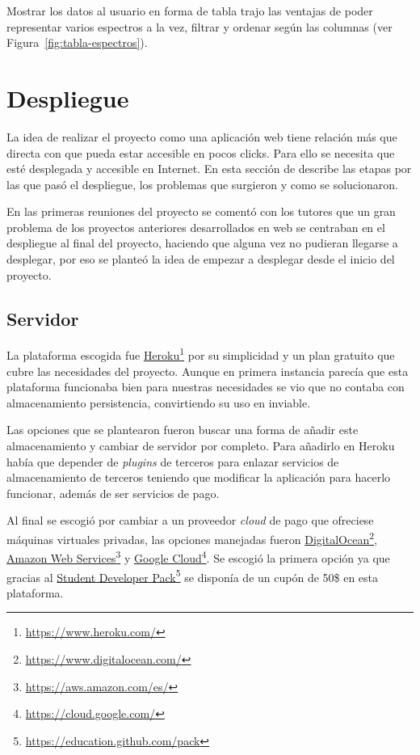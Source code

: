 Mostrar los datos al usuario en forma de tabla trajo las ventajas de poder
representar varios espectros a la vez, filtrar y ordenar según las columnas (ver
Figura~\ref{fig:tabla-espectros}).


\section{Despliegue}\label{sec:despliegue}

La idea de realizar el proyecto como una aplicación web tiene relación más que directa con que pueda estar accesible en pocos clicks. Para ello se necesita que esté desplegada y accesible en Internet. En esta sección de describe las etapas por las que pasó el despliegue, los problemas que surgieron y como se solucionaron.

En las primeras reuniones del proyecto se comentó con los tutores que un gran problema de los proyectos anteriores desarrollados en web se centraban en el despliegue al final del proyecto, haciendo que alguna vez no pudieran llegarse a desplegar, por eso se planteó la idea de empezar a desplegar desde el inicio del proyecto.

\subsection{Servidor}

La plataforma escogida fue \href{https://www.heroku.com/}{Heroku}\footnote{\url{https://www.heroku.com/}} por su simplicidad y un plan gratuito que cubre las necesidades del proyecto. Aunque en primera instancia parecía que esta plataforma funcionaba bien para nuestras necesidades se vio que no contaba con almacenamiento persistencia, convirtiendo su uso en inviable.

Las opciones que se plantearon fueron buscar una forma de añadir este almacenamiento y cambiar de servidor por completo. Para añadirlo en Heroku había que depender de \textit{plugins} de terceros para enlazar servicios de almacenamiento de terceros teniendo que modificar la aplicación para hacerlo funcionar, además de ser servicios de pago.

Al final se escogió por cambiar a un proveedor \textit{cloud} de pago que ofreciese máquinas virtuales privadas, las opciones manejadas fueron \href{https://www.digitalocean.com/}{DigitalOcean}\footnote{\url{https://www.digitalocean.com/}}, \href{https://aws.amazon.com/es/}{Amazon Web Services}\footnote{\url{https://aws.amazon.com/es/}} y \href{https://cloud.google.com/}{Google Cloud}\footnote{\url{https://cloud.google.com/}}. Se escogió la primera opción ya que gracias al \href{https://education.github.com/pack}{Student Developer Pack}\footnote{\url{https://education.github.com/pack}} se disponía de un cupón de 50\$ en esta plataforma.

